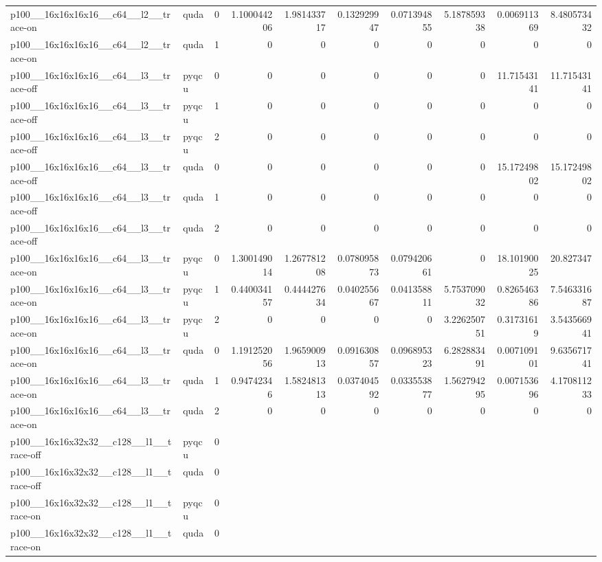 \begin{table}[htbp]
\begin{tabular}{@{}llrrrrrrrr@{}}
p100\_\_16x16x16x16\_\_c64\_\_l2\_\_trace-on & quda & 0 & 1.100044206 & 1.981433717 & 0.132929947 & 0.071394855 & 5.187859338 & 0.006911369 & 8.480573432 \\
p100\_\_16x16x16x16\_\_c64\_\_l2\_\_trace-on & quda & 1 & 0 & 0 & 0 & 0 & 0 & 0 & 0 \\
p100\_\_16x16x16x16\_\_c64\_\_l3\_\_trace-off & pyqcu & 0 & 0 & 0 & 0 & 0 & 0 & 11.71543141 & 11.71543141 \\
p100\_\_16x16x16x16\_\_c64\_\_l3\_\_trace-off & pyqcu & 1 & 0 & 0 & 0 & 0 & 0 & 0 & 0 \\
p100\_\_16x16x16x16\_\_c64\_\_l3\_\_trace-off & pyqcu & 2 & 0 & 0 & 0 & 0 & 0 & 0 & 0 \\
p100\_\_16x16x16x16\_\_c64\_\_l3\_\_trace-off & quda & 0 & 0 & 0 & 0 & 0 & 0 & 15.17249802 & 15.17249802 \\
p100\_\_16x16x16x16\_\_c64\_\_l3\_\_trace-off & quda & 1 & 0 & 0 & 0 & 0 & 0 & 0 & 0 \\
p100\_\_16x16x16x16\_\_c64\_\_l3\_\_trace-off & quda & 2 & 0 & 0 & 0 & 0 & 0 & 0 & 0 \\
p100\_\_16x16x16x16\_\_c64\_\_l3\_\_trace-on & pyqcu & 0 & 1.300149014 & 1.267781208 & 0.078095873 & 0.079420661 & 0 & 18.10190025 & 20.827347 \\
p100\_\_16x16x16x16\_\_c64\_\_l3\_\_trace-on & pyqcu & 1 & 0.440034157 & 0.444427634 & 0.040255667 & 0.041358811 & 5.753709032 & 0.826546386 & 7.546331687 \\
p100\_\_16x16x16x16\_\_c64\_\_l3\_\_trace-on & pyqcu & 2 & 0 & 0 & 0 & 0 & 3.226250751 & 0.31731619 & 3.543566941 \\
p100\_\_16x16x16x16\_\_c64\_\_l3\_\_trace-on & quda & 0 & 1.191252056 & 1.965900913 & 0.091630857 & 0.096895323 & 6.282883491 & 0.007109101 & 9.635671741 \\
p100\_\_16x16x16x16\_\_c64\_\_l3\_\_trace-on & quda & 1 & 0.94742346 & 1.582481313 & 0.037404592 & 0.033553877 & 1.562794295 & 0.007153696 & 4.170811233 \\
p100\_\_16x16x16x16\_\_c64\_\_l3\_\_trace-on & quda & 2 & 0 & 0 & 0 & 0 & 0 & 0 & 0 \\
p100\_\_16x16x32x32\_\_c128\_\_l1\_\_trace-off & pyqcu & 0 &  &  &  &  &  &  &  \\
p100\_\_16x16x32x32\_\_c128\_\_l1\_\_trace-off & quda & 0 &  &  &  &  &  &  &  \\
p100\_\_16x16x32x32\_\_c128\_\_l1\_\_trace-on & pyqcu & 0 &  &  &  &  &  &  &  \\
p100\_\_16x16x32x32\_\_c128\_\_l1\_\_trace-on & quda & 0 &  &  &  &  &  &  &  \\

\end{tabular}
\end{table}
